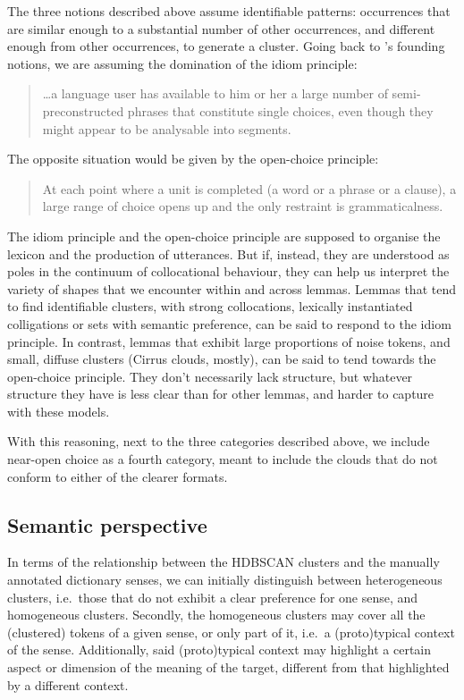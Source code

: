\documentclass[
]{book}
\begin{document}
The three notions described above assume identifiable patterns: occurrences that are similar enough to a substantial number of other occurrences, and different enough from other occurrences, to generate a cluster. Going back to \textcite{sinclair_1991}'s founding notions, we are assuming the domination of the idiom principle:

\begin{quote}
\ldots a language user has available to him or her a large number of semi-preconstructed phrases that constitute single choices, even though they might appear to be analysable into segments. \autocite[ 110]{sinclair_1991}
\end{quote}

The opposite situation would be given by the open-choice principle:

\begin{quote}
At each point where a unit is completed (a word or a phrase or a clause), a large range of choice opens up and the only restraint is grammaticalness. \autocite[ 109]{sinclair_1991}
\end{quote}

The idiom principle and the open-choice principle are supposed to organise the lexicon and the production of utterances. But if, instead, they are understood as poles in the continuum of collocational behaviour, they can help us interpret the variety of shapes that we encounter within and across lemmas. Lemmas that tend to find identifiable clusters, with strong collocations, lexically instantiated colligations or sets with semantic preference, can be said to respond to the idiom principle. In contrast, lemmas that exhibit large proportions of noise tokens, and small, diffuse clusters (Cirrus clouds, mostly), can be said to tend towards the open-choice principle. They don't necessarily lack structure, but whatever structure they have is less clear than for other lemmas, and harder to capture with these models.

With this reasoning, next to the three categories described above, we include near-open choice as a fourth category, meant to include the clouds that do not conform to either of the clearer formats.

\hypertarget{semantically}{%
\subsection{Semantic perspective}\label{semantically}}

In terms of the relationship between the HDBSCAN clusters and the manually annotated dictionary senses, we can initially distinguish between heterogeneous clusters, i.e.~those that do not exhibit a clear preference for one sense, and homogeneous clusters. Secondly, the homogeneous clusters may cover all the (clustered) tokens of a given sense, or only part of it, i.e.~a (proto)typical context of the sense. Additionally, said (proto)typical context may highlight a certain aspect or dimension of the meaning of the target, different from that highlighted by a different context.
\end{document}
